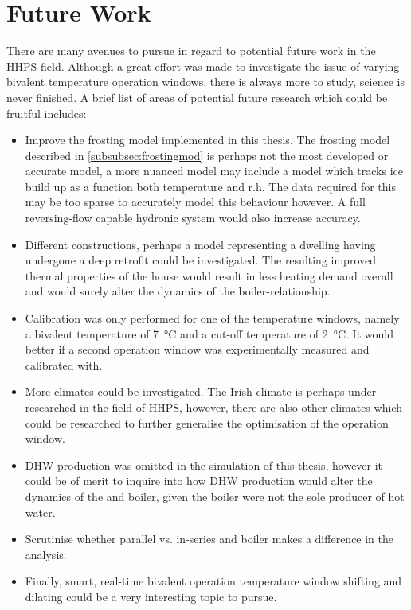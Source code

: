 \section{Future Work}
There are many avenues to pursue in regard to potential future work in the \ac{HHPS} field. Although a great effort was made to investigate the issue of varying bivalent temperature operation windows, there is always more to study, science is never finished. A brief list of areas of potential future research which could be fruitful includes:
\begin{itemize}
    \item Improve the frosting model implemented in this thesis. The frosting model described in \cref{subsubsec:frostingmod} is perhaps not the most developed or accurate model, a more nuanced model may include a model which tracks ice build up as a function both temperature and r.h. The data required for this may be too sparse to accurately model this behaviour however. A full reversing-flow capable hydronic system would also increase accuracy.
    \item Different constructions, perhaps a model representing a dwelling having undergone a deep retrofit could be investigated. The resulting improved thermal properties of the house would result in less heating demand overall and would surely alter the dynamics of the boiler-\HP relationship.
    \item Calibration was only performed for one of the temperature windows, namely a bivalent temperature of \qty{7}{\celsius} and a cut-off temperature of \qty{2}{\celsius}. It would better if a second operation window was experimentally measured and calibrated with. 
    \item More climates could be investigated. The Irish climate is perhaps under researched in the field of \ac{HHPS}, however, there are also other climates which could be researched to further generalise the optimisation of the operation window.
    \item \ac{DHW} production was omitted in the simulation of this thesis, however it could be of merit to inquire into how  \ac{DHW} production would alter the dynamics of the \HP and boiler, given the boiler were not the sole producer of hot water.
    \item Scrutinise whether parallel vs. in-series \HP and boiler makes a difference in the analysis.
    \item Finally, smart, real-time bivalent operation temperature window shifting and dilating could be a very interesting topic to pursue. 
\end{itemize}

